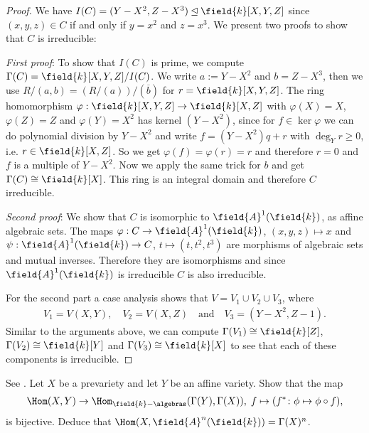 \begin{proof}
  We have $I(C)=(Y-X^2,Z-X^3)\unlhd \field{k}[X,Y,Z]$ since $(x,y,z)\in C$ if and only if $y=x^2$ and $z=x^3$. We present two proofs to show that $C$ is irreducible:
  
  \textit{First proof}: To show that $I(C)$ is prime, we compute $\Gamma(C)=\field{k}[X,Y,Z]/I(C)$. We write $a:=Y-X^2$ and $b=Z-X^3$, then we use $R/(a,b)=(R/(a))/(\overline{b})$ for $r=\field{k}[X,Y,Z]$. The ring homomorphism $\varphi:\field{k}[X,Y,Z]\to \field{k}[X,Z]$ with $\varphi(X)=X$, $\varphi(Z)=Z$ and $\varphi(Y)=X^2$ has kernel $(Y-X^2)$, since for $f\in \ker \varphi$ we can do polynomial division by $Y-X^2$ and write $f=(Y-X^2)q+r$ with $\deg_Y r\geq 0$, i.e. $r\in \field{k}[X,Z]$. So we get $\varphi(f)=\varphi(r)=r$ and therefore $r=0$ and $f$ is a multiple of $Y-X^2$. Now we apply the same trick for $b$ and get $\Gamma(C)\cong \field{k}[X]$. This ring is an integral domain and therefore $C$ irreducible.

  \textit{Second proof}: We show that $C$ is isomorphic to $\field{A}^1(\field{k})$, as affine algebraic sets. The maps $\varphi:C\to \field{A}^1(\field{k})$, $(x,y,z)\mapsto x$ and $\psi:\field{A}^1(\field{k})\to C$, $t\mapsto (t,t^2,t^3)$ are morphisms of algebraic sets and mutual inverses. Therefore they are isomorphisms and since $\field{A}^1(\field{k})$ is irreducible $C$ is also irreducible.

For the second part a case analysis shows that $V=V_1\cup V_2\cup V_3$, where
\begin{align*}
  V_1=V(X,Y),\quad V_2=V(X,Z)\quad\text{and}\quad V_3=(Y-X^2,Z-1).
\end{align*}
Similar to the arguments above, we can compute $\Gamma(V_1)\cong \field{k}[Z]$, $\Gamma(V_2)\cong \field{k}[Y]$ and $\Gamma(V_3)\cong \field{k}[X]$ to see that each of these components is irreducible.
\end{proof}

\begin{exercise}
  See \cite[Exercise 1.14]{görtz2010algebraic}.
  Let $X$ be a prevariety and let $Y$ be an affine variety. Show that
  the map
  \begin{align*}
  \Hom(X, Y ) \rightarrow  \Hom_{\field{k}-\algebras}(\Gamma(Y ),
    \Gamma (X)),\; f \mapsto (f^* \colon \phi \mapsto \phi \circ f),
  \end{align*}
  is bijective. Deduce that $\Hom(X, \field{A}^n(\field{k})) = \Gamma(X)^n$.
\end{exercise}



